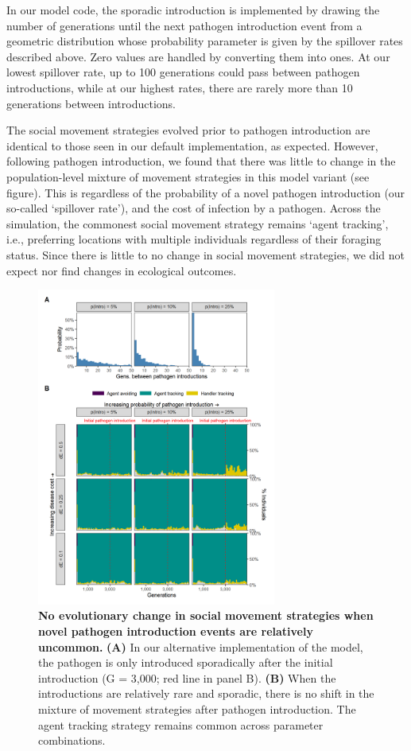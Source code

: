 In our model code, the sporadic introduction is implemented by drawing the number of generations until the next pathogen introduction event from a geometric distribution whose probability parameter is given by the spillover rates described above.
Zero values are handled by converting them into ones.
At our lowest spillover rate, up to 100 generations could pass between pathogen introductions, while at our highest rates, there are rarely more than 10 generations between introductions.

The social movement strategies evolved prior to pathogen introduction are identical to those seen in our default implementation, as expected.
However, following pathogen introduction, we found that there was little to change in the population-level mixture of movement strategies in this model variant (see figure).
This is regardless of the probability of a novel pathogen introduction (our so-called `spillover rate'), and the cost of infection by a pathogen.
Across the simulation, the commonest social movement strategy remains `agent tracking', i.e., preferring locations with multiple individuals regardless of their foraging status.
Since there is little to no change in social movement strategies, we did not expect nor find changes in ecological outcomes.

\begin{figure}
    \centering
    \includegraphics[width=0.7\textwidth]{figures/pathomove/fig_evo_strategy_sporadic.png}
    \caption{\textbf{No evolutionary change in social movement strategies when novel pathogen introduction events are relatively uncommon.} \textbf{(A)} In our alternative implementation of the model, the pathogen is only introduced sporadically after the initial introduction (G = 3,000; red line in panel B). \textbf{(B)} When the introductions are relatively rare and sporadic, there is no shift in the mixture of movement strategies after pathogen introduction. The agent tracking strategy remains common across parameter combinations.}
\end{figure}

{ \begin{center}  \end{center} }

\endgroup

